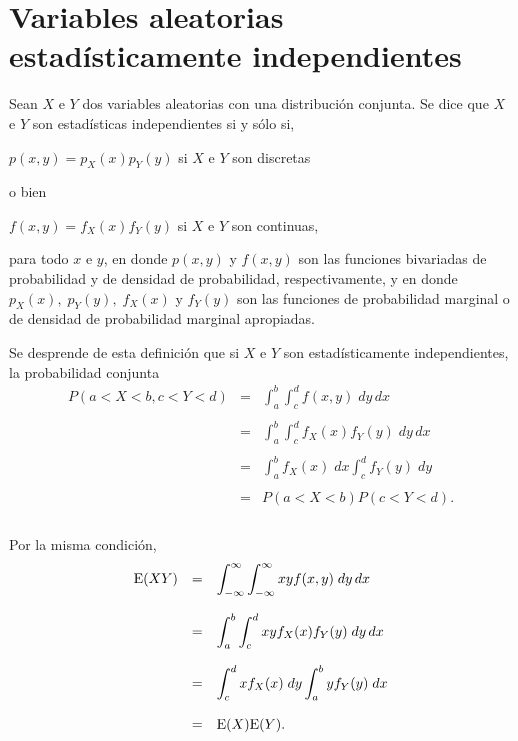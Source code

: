 \section{Variables aleatorias estadísticamente independientes}

\begin{tcolorbox}
    \begin{def.}
	Sean $X$ e $Y$ dos variables aleatorias con una distribución conjunta. Se dice que $X$ e $Y$ son estadísticas independientes si y sólo si,
	\begin{center}
	    $p(x,y)=p_X(x)p_Y(y)$ si $X$ e $Y$ son discretas
	\end{center}
	o bien 
	\begin{center}
	    $f(x,y)=f_X(x)f_Y(y)$ si $X$ e $Y$ son continuas, 
	\end{center}
	para todo $x$ e $y$, en donde $p(x,y)$ y $f(x,y)$ son las funciones bivariadas de probabilidad y de densidad de probabilidad, respectivamente, y en donde $p_X(x),\; p_Y(y),\; f_X(x)$ y $f_Y(y)$ son las funciones de probabilidad marginal o de densidad de probabilidad marginal apropiadas.
    \end{def.}
\end{tcolorbox}

Se desprende de esta definición que si $X$ e $Y$ son estadísticamente independientes, la probabilidad conjunta
$$\begin{array}{rcl}
    P(a<X<b,c<Y<d) &=& \displaystyle\int_a^b \int_c^d f(x,y)\; dy\, dx\\\\
		   &=& \displaystyle\int_a^b \int_c^d f_X(x)f_Y(y)\; dy \, dx\\\\
		   &=& \displaystyle\int_a^b f_X(x)\; dx \int_c^d f_Y(y)\; dy\\\\
		   &=& P(a<X<b) P(c<Y<d).\\\\
\end{array}$$

Por la misma condición,
$$\begin{array}{rcl}
    \mathrm{E}(XY) &=& \displaystyle\int_{-\infty}^\infty \int_{-\infty}^\infty xyf(x,y)\; dy\, dx\\\\
	   &=& \displaystyle\int_a^b \int_c^d xyf_X(x)f_Y(y)\; dy \, dx\\\\
	   &=& \displaystyle\int_c^d xf_X(x)\; dy \int_a^b yf_Y(y)\; dx\\\\
	   &=& \mathrm{E}(X)\mathrm{E}(Y).\\\\
\end{array}$$

